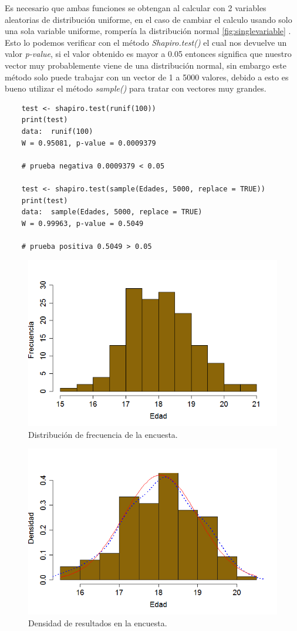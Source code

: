 \documentclass[]{article}
\begin{document}
Es necesario que ambas funciones se obtengan al calcular con 2 variables aleatorias de distribución uniforme, en el caso de cambiar el calculo usando solo una sola variable uniforme, rompería la distribución normal \autoref{fig:singlevariable} .
Esto lo podemos verificar con el método \textit{Shapiro.test()}
el cual nos devuelve un valor \textit{p-value}, si el valor obtenido es mayor a 0.05 entonces significa que nuestro vector muy probablemente viene de una distribución normal, sin embargo este método solo puede trabajar con un vector de 1 a 5000 valores, debido a esto es bueno utilizar el método \textit{sample()} para tratar con vectores muy grandes.
  \begin{lstlisting}
    test <- shapiro.test(runif(100)) 
    print(test)
    data:  runif(100)
	W = 0.95081, p-value = 0.0009379
	
	# prueba negativa 0.0009379 < 0.05
	                 
    test <- shapiro.test(sample(Edades, 5000, replace = TRUE))
    print(test)
	data:  sample(Edades, 5000, replace = TRUE)
	W = 0.99963, p-value = 0.5049
	
	# prueba positiva 0.5049 > 0.05
   \end{lstlisting}



\begin{figure}[b]
    \centering
    \includegraphics[width=.5\linewidth]{Frecuencia.png}    \caption{Distribución de frecuencia de la encuesta.}
    \label{fig:Negativo}
\end{figure}

\begin{figure}[b]
    \centering
    \includegraphics[width=.5\linewidth]{Densidad.png}    \caption{Densidad de resultados en la encuesta.}
    \label{fig:Densidad}
\end{figure}
\end{document}
